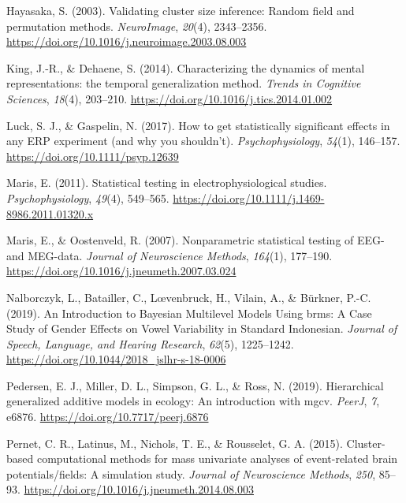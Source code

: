 \documentclass[
  doc,
  floatsintext,
  longtable,
  a4paper,
  nolmodern,
  notxfonts,
  notimes,
  colorlinks=true,linkcolor=blue,citecolor=blue,urlcolor=blue]{apa7}
\newlength{\cslhangindent}
\newenvironment{CSLReferences}[2] %
 {\begin{list}{}{%
  \setlength{\itemindent}{0pt}
  \setlength{\leftmargin}{0pt}
  \setlength{\parsep}{0pt}
  \ifodd #1
   \setlength{\leftmargin}{\cslhangindent}
   \setlength{\itemindent}{-1\cslhangindent}
  \fi
  \setlength{\itemsep}{#2\baselineskip}}}
 {\end{list}}
\begin{document}
\begin{CSLReferences}{1}{0}
Hayasaka, S. (2003). Validating cluster size inference: Random field and
permutation methods. \emph{NeuroImage}, \emph{20}(4), 2343--2356.
\url{https://doi.org/10.1016/j.neuroimage.2003.08.003}

King, J.-R., \& Dehaene, S. (2014). Characterizing the dynamics of
mental representations: the temporal generalization method. \emph{Trends
in Cognitive Sciences}, \emph{18}(4), 203--210.
\url{https://doi.org/10.1016/j.tics.2014.01.002}

Luck, S. J., \& Gaspelin, N. (2017). How to get statistically
significant effects in any {ERP} experiment (and why you shouldn't).
\emph{Psychophysiology}, \emph{54}(1), 146--157.
\url{https://doi.org/10.1111/psyp.12639}

Maris, E. (2011). Statistical testing in electrophysiological studies.
\emph{Psychophysiology}, \emph{49}(4), 549--565.
\url{https://doi.org/10.1111/j.1469-8986.2011.01320.x}

Maris, E., \& Oostenveld, R. (2007). Nonparametric statistical testing
of EEG- and MEG-data. \emph{Journal of Neuroscience Methods},
\emph{164}(1), 177--190.
\url{https://doi.org/10.1016/j.jneumeth.2007.03.024}

Nalborczyk, L., Batailler, C., Lœvenbruck, H., Vilain, A., \& Bürkner,
P.-C. (2019). An Introduction to Bayesian Multilevel Models Using brms:
A Case Study of Gender Effects on Vowel Variability in Standard
Indonesian. \emph{Journal of Speech, Language, and Hearing Research},
\emph{62}(5), 1225--1242.
\url{https://doi.org/10.1044/2018_jslhr-s-18-0006}

Pedersen, E. J., Miller, D. L., Simpson, G. L., \& Ross, N. (2019).
Hierarchical generalized additive models in ecology: An introduction
with mgcv. \emph{PeerJ}, \emph{7}, e6876.
\url{https://doi.org/10.7717/peerj.6876}

Pernet, C. R., Latinus, M., Nichols, T. E., \& Rousselet, G. A. (2015).
Cluster-based computational methods for mass univariate analyses of
event-related brain potentials/fields: A simulation study. \emph{Journal
of Neuroscience Methods}, \emph{250}, 85--93.
\url{https://doi.org/10.1016/j.jneumeth.2014.08.003}


\end{CSLReferences}
\end{document}
